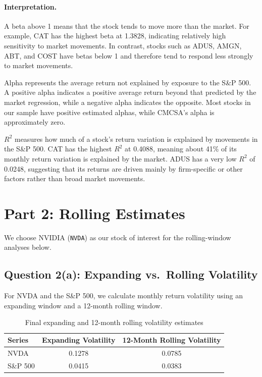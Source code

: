 \documentclass[11pt]{article}
\begin{document}
\paragraph{Interpretation.} A beta above 1 means that the stock tends to move more than the market. For example, CAT has the highest beta at 1.3828, indicating relatively high sensitivity to market movements. In contrast, stocks such as ADUS, AMGN, ABT, and COST have betas below 1 and therefore tend to respond less strongly to market movements.

Alpha represents the average return not explained by exposure to the S\&P 500. A positive alpha indicates a positive average return beyond that predicted by the market regression, while a negative alpha indicates the opposite. Most stocks in our sample have positive estimated alphas, while CMCSA's alpha is approximately zero.

$R^2$ measures how much of a stock's return variation is explained by movements in the S\&P 500. CAT has the highest $R^2$ at 0.4088, meaning about 41\% of its monthly return variation is explained by the market. ADUS has a very low $R^2$ of 0.0248, suggesting that its returns are driven mainly by firm-specific or other factors rather than broad market movements.

\section{Part 2: Rolling Estimates}

We choose NVIDIA (\texttt{NVDA}) as our stock of interest for the rolling-window analyses below.

\subsection{Question 2(a): Expanding vs.\ Rolling Volatility}

For NVDA and the S\&P 500, we calculate monthly return volatility using an expanding window and a 12-month rolling window.

\begin{table}[H]
\centering
\caption{Final expanding and 12-month rolling volatility estimates}
\begin{tabular}{lcc}
\toprule
Series & Expanding Volatility & 12-Month Rolling Volatility \\
\midrule
NVDA     & 0.1278 & 0.0785 \\
S\&P 500 & 0.0415 & 0.0383 \\
\bottomrule
\end{tabular}
\end{table}
\end{document}
